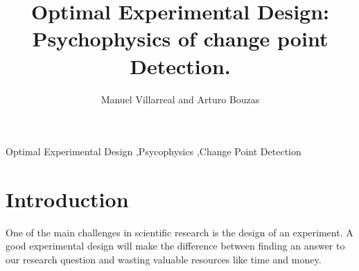 \documentclass[preprint,review,12pt]{elsarticle}
\begin{document}
\begin{frontmatter}


\title{Optimal Experimental Design: Psychophysics of change point Detection.}




\author{Manuel Villarreal and Arturo Bouzas}

\address{Mexico City, Mexico}

\begin{abstract}
\end{abstract}

\begin{keyword}
Optimal Experimental Design \sep Psycophysics \sep Change Point Detection


\end{keyword}

\end{frontmatter}

\linenumbers

\section{Introduction}
\label{S:1}

One of the main challenges in scientific research is the design of an experiment. A good experimental design will make the difference between finding an answer to our research question and wasting valuable resources like time and money.
\end{document}
